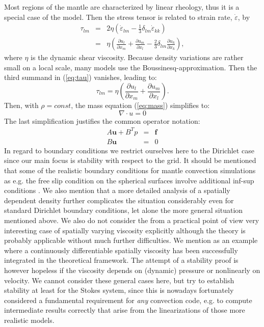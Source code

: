 \documentclass[times]{fldauth}
\newcommand{\mb}{\mathbf}
\newcommand{\pdiff}[2]{\frac{\partial#1}{\partial #2}}
\begin{document}
Most regions of the mantle are characterized by linear rheology, thus it is a special case of the model.
Then the stress tensor is related to strain rate, $\dot\varepsilon$, by
\begin{eqnarray}
   \tau_{lm} &=& 2\eta\left(
	 \dot\varepsilon_{lm} - \frac{1}{3}\delta_{lm}\dot\varepsilon_{kk}
	 \right) \\
      &=&  \eta\left( \pdiff{u_l}{x_m} + \pdiff{u_m}{x_l} 
	 - \frac{2}{3} \delta_{lm}\pdiff{u_k}{x_k} \right), \label{eq:tau} 
\end{eqnarray}
where $\eta$ is the dynamic shear viscosity. 
Because density variations are rather small on a local scale, many models use the Boussinesq-approximation. 
Then the third summand in (\ref{eq:tau}) 
vanishes, leading to:
\begin{equation}
   \tau_{lm} = \eta \left(\pdiff{u_l}{x_m} + \pdiff{u_m}{x_l}\right).
   \label{eq:tau_inc} 
\end{equation}
Then, with $\rho=const$, the mass equation (\ref{eq:mass}) simplifies to:
\begin{equation}
   \nabla \cdot  u = 0  \label{eq:mass_inc} 
\end{equation}
The last simplification justifies the common operator notation:
\begin{eqnarray*}
A \mb u + B^T p 	&=& 	\mb f \\
          B \mb u	&=&	0
\end{eqnarray*}
In regard to boundary conditions we restrict ourselves here to the Dirichlet case since our main focus is stability with respect to the grid. 
It should be mentioned that some of the realistic boundary conditions for mantle convection simulations as e.g. the free slip condition on the spherical surfaces involve additional inf-sup conditions \cite{Finite_element_approximation_of_incompressible_Navier_Stokes_equations_with_slip_boundary_condition,Finite_element_approximation_of_incompressible_Navier_Stokes_equations_with_slip_boundary_condition_II}.
We also mention that a more detailed analysis of a spatially dependent density further complicates the situation considerably \cite{bernardi_Finite_Element_Approximation_of_Viscous_Flows_with_Varying_Density} even for standard Dirichlet boundary conditions, let alone the more general situation mentioned above. 
We also do not consider the from a practical point of view very interesting case of spatially varying viscosity explicitly although the theory is probably applicable without much further difficulties. 
We mention \cite{Tabata2000,Tabata2002,Tabata2006} as an example where a continuously differentiable spatially viscosity has been successfully integrated in the theoretical framework.
The attempt of a stability proof is however hopeless if the viscosity depends on (dynamic) pressure or nonlinearly on velocity.
We cannot consider these general cases here, but try to establish stability at least for the  Stokes system, since this is nowadays fortunately considered a fundamental requirement for 
\emph{any} convection code, e.g. to compute intermediate results correctly that arise from the linearizations of those more realistic models.  
\end{document}
